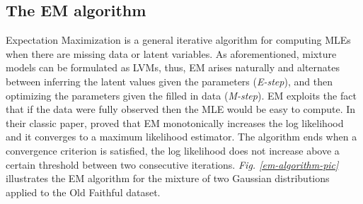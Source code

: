 \subsection{The EM algorithm} \label{em-algorithm-l-subsect}
Expectation Maximization is a general iterative algorithm for computing MLEs when there are missing data or latent variables. As aforementioned, mixture models can be formulated as LVMs, thus, EM arises naturally and alternates between inferring the latent values given the parameters (\emph{E-step}), and then optimizing the parameters given the filled in data (\emph{M-step}). EM exploits the fact that if the data were fully observed then the MLE would be easy to compute. In their classic paper, \cite{Dempster1977} proved that EM monotonically increases the log likelihood and it converges to a maximum likelihood estimator. The algorithm ends when a convergence criterion is satisfied, \eg the log likelihood does not increase above a certain threshold between two consecutive iterations. \emph{Fig. \ref{em-algorithm-pic}} illustrates the EM algorithm for the mixture of two Gaussian distributions applied to the Old Faithful dataset.
